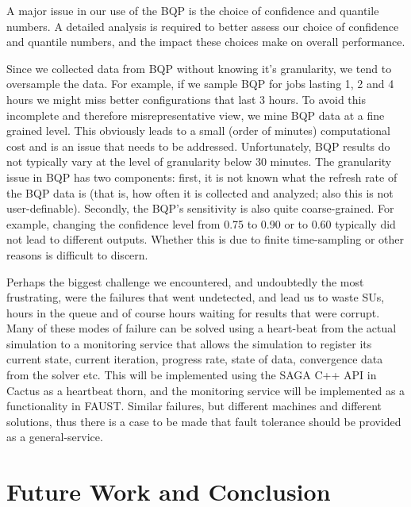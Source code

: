 \documentclass{sig-alternate}
\newcommand{\jhanote}[1]{ {\textcolor{red} { ***Jha: #1 }}}
\newcommand{\jhanote}[1]{}
\begin{document}
A major issue in our use of the BQP is the choice of confidence and
quantile numbers. A detailed analysis is required to better assess our
choice of confidence and quantile numbers, and the impact these choices
make on overall performance.

Since we collected data from BQP without knowing it's granularity, we
tend to oversample the data. For example, if we sample BQP for jobs
lasting 1, 2 and 4 hours we might miss better configurations that last
3 hours. To avoid this incomplete and therefore misrepresentative
view, we mine BQP data at a fine grained level. This obviously leads
to a small (order of minutes) computational cost and is an issue that
needs to be addressed. Unfortunately, BQP results do not typically
vary at the level of granularity below 30 minutes.  The granularity
issue in BQP has two components: first, it is not known what the
refresh rate of the BQP data is (that is, how often it is collected
and analyzed; also this is not user-definable).  Secondly, the BQP's
sensitivity is also quite coarse-grained. For example, changing the
confidence level from 0.75 to 0.90 or to 0.60 typically did not
lead to different outputs.  Whether this is due to finite
time-sampling or other reasons is difficult to discern.

Perhaps the biggest challenge we encountered, and undoubtedly the most
frustrating, were the failures that went undetected, and lead us to
waste SUs, hours in the queue and of course hours waiting for results
that were corrupt. Many of these modes of failure can be solved using
a heart-beat from the actual simulation to a monitoring service that
allows the simulation to register its current state, current
iteration, progress rate, state of data, convergence data from the
solver etc. This will be implemented using the SAGA C++ API in Cactus
as a heartbeat thorn, and the monitoring service will be implemented
as a functionality in FAUST.  Similar failures, but
different machines and different solutions, thus there is a case to be
made that fault tolerance should be provided as a general-service.


\section{Future Work and Conclusion}

\end{document}
